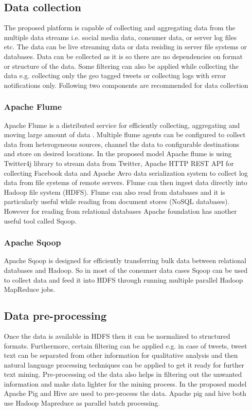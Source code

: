 \subsection{Data collection}
The proposed platform is capable of collecting and aggregating data from the multiple data streams i.e. social media data, consumer data, or server log files etc. The data can be live streaming data or data residing in server file systems or databases. Data can be collected as it is so there are no dependencies on format or structure of the data. Some filtering can also be applied while collecting the data e.g. collecting only the geo tagged tweets or collecting logs with error notifications only. Following two components are recommended for data collection
\subsubsection{Apache Flume}
Apache Flume is a distributed service for efficiently collecting, aggregating and moving large amount of data \cite{flume}. Multiple flume agents can be configured to collect data from heterogeneous sources, channel the data to configurable destinations and store on desired locations. In the proposed model Apache flume is using Twitter4j library to stream data from Twitter, Apache HTTP REST API for collecting Facebook data and Apache Avro\cite{avro} data serialization system to collect log data from file systems of remote servers. Flume can then ingest data directly into Hadoop file system (HDFS). Flume can also read from databases and it is particularly useful while reading from document stores (NoSQL databases). However for reading from relational databases Apache foundation has another useful tool called Sqoop.
\subsubsection{Apache Sqoop}
Apache Sqoop \cite{sqoop} is designed for efficiently transferring bulk data between relational databases and Hadoop. So in most of the consumer data cases Sqoop can be used to collect data and feed it into HDFS through running multiple parallel Hadoop MapReduce jobs.
\subsection{Data pre-processing}
Once the data is available in HDFS then it can be normalized to structured formats. Furthermore, certain filtering can be applied e.g. in case of tweets, tweet text can be separated from other information for qualitative analysis and then natural language processing techniques can be applied to get it ready for further text mining. Pre-processing od the data also helps in filtering out the unwanted information and make data lighter for the mining process. In the proposed model Apache Pig and Hive are used to pre-process the data. Apache pig and hive both use Hadoop Mapreduce as parallel batch processing. 

